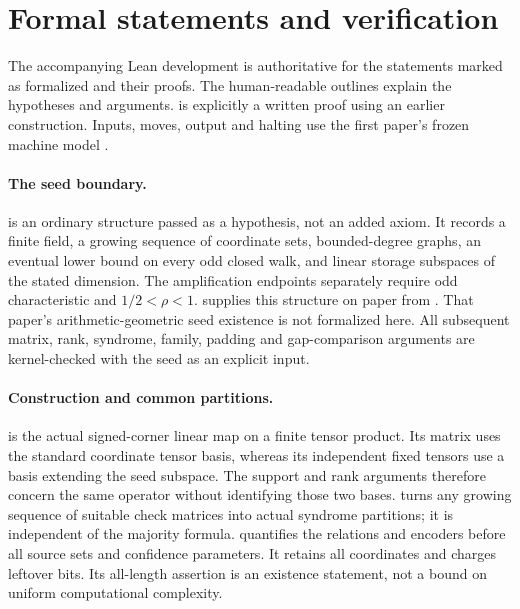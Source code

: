 \section{Formal statements and verification}\label{sec:verification}

The accompanying Lean development is authoritative for the statements
marked as formalized and their proofs. The human-readable outlines
explain the hypotheses and arguments.  is
explicitly a written proof using an earlier construction. Inputs,
moves, output and halting use the first paper's frozen machine model
\cite{PaperOne}.

\paragraph{The seed boundary.}
 is an ordinary structure
passed as a hypothesis, not an added axiom. It records a finite field,
a growing sequence of coordinate sets, bounded-degree graphs, an
eventual lower bound on every odd closed walk, and linear storage
subspaces of the stated dimension. The amplification endpoints
separately require odd characteristic and $1/2<\rho<1$.
 supplies this structure on paper from
\cite[Theorem~A and Corollary~U(a,b)]{PaperThirteen}. That paper's
arithmetic-geometric seed existence is not formalized here. All
subsequent matrix, rank, syndrome, family, padding and gap-comparison
arguments are kernel-checked with the seed as an explicit input.

\paragraph{Construction and common partitions.}
 is the actual signed-corner
linear map on a finite tensor product. Its matrix uses the standard
coordinate tensor basis, whereas its independent fixed tensors use a
basis extending the seed subspace. The support and rank arguments
therefore concern the same operator without identifying those two
bases. 
turns any growing sequence of suitable check matrices into actual
syndrome partitions; it is independent of the majority formula.
 quantifies the
relations and encoders before all source sets and confidence
parameters. It retains all coordinates and charges leftover bits.
Its all-length assertion is an existence statement, not a bound on
uniform computational complexity.

